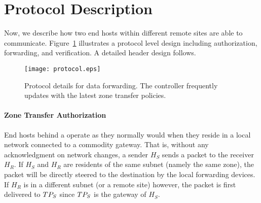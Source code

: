 


\section{Protocol Description}
\label{sec:protocol}

Now, we describe how two end hosts within different remote sites are able to communicate. 
Figure~\ref{fig:protocol} illustrates a protocol level design including authorization,
forwarding, and verification. A detailed header design follows.

\begin{figure}[t]
	\begin{center}
		\texttt{[image: protocol.eps]}
	\end{center}
	\caption{Protocol details for data forwarding. The controller frequently updates \tps 
	with the latest zone transfer policies.}
	
	\label{fig:protocol}
\end{figure}


\paragraph{Zone Transfer Authorization}
End hosts behind a \tp operate as they normally would when they reside in a local network connected to a commodity gateway. That is, without any acknowledgment on network changes, a sender $H_S$ 
sends a packet to the receiver $H_R$. If $H_S$ and $H_R$ are residents of the same subnet 
(namely the same zone), the packet will be directly steered to the destination by the local 
forwarding devices. If $H_R$ is in a different subnet (or a remote site) however, the packet
is first delivered to $TP_S$ since $TP_S$ is the gateway of $H_S$. %

